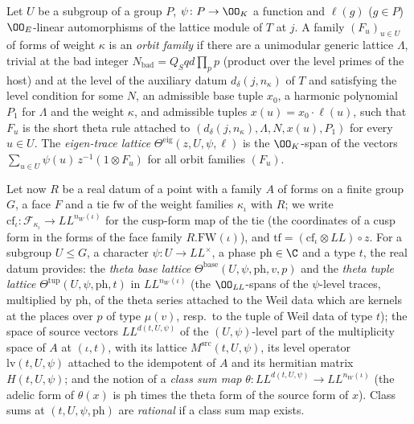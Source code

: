\begin{definition}\label{pf:onto3:thetaeig}
Let $U$ be a subgroup of a group $P$, $\psi\colon P\to\OO_K$ a function and $\ell(g)$ ($g\in P$) $\OO_E$-linear
automorphisms of the lattice module of $T$ at $j$. A family $(F_u)_{u\in U}$ of forms of weight $\kappa$ is an
\emph{orbit family} if there are a unimodular generic lattice $\Lambda$, trivial at the bad integer
$N_{\mathrm{bad}}=Q_Sqd\prod_pp$ (product over the level primes of the host) and at the level of the auxiliary datum
$d_\delta(j,n_\kappa)$ of $T$ and satisfying the level condition for some $N$, an admissible base tuple $x_0$, a
harmonic polynomial $P_1$ for $\Lambda$ and the weight $\kappa$, and admissible tuples $x(u)=x_0\cdot\ell(u)$, such
that $F_u$ is the short theta rule attached to $(d_\delta(j,n_\kappa),\Lambda,N,x(u),P_1)$ for every $u\in U$. The
\emph{eigen-trace lattice} $\Theta^{\mathrm{eig}}(z,U,\psi,\ell)$ is the $\OO_K$-span of the vectors
$\sum_{u\in U}\psi(u)\,z^{-1}(1\otimes F_u)$ for all orbit families $(F_u)$.
\end{definition}

Let now $R$ be a real datum of a point with a family $A$ of forms on a finite group $G$, a face $F$ and a tie
$\mathrm{fw}$ of the weight families $\kappa_\iota$ with $R$; we write $\mathrm{cf}_\iota\colon\mathcal F_{\kappa_\iota}
\to\mathit{LL}^{n_W(\iota)}$ for the cusp-form map of the tie (the coordinates of a cusp form in the forms of the face
family $R.\mathrm{FW}(\iota)$), and $\mathrm{tf}=(\mathrm{cf}_\iota\otimes\mathit{LL})\circ z$. For a subgroup
$U\le G$, a character $\psi\colon U\to\mathit{LL}^\times$, a phase $\mathrm{ph}\in\C$ and a type $t$, the real datum
provides: the \emph{theta base lattice} $\Theta^{\mathrm{base}}(U,\psi,\mathrm{ph},v,p)$ and the \emph{theta tuple
lattice} $\Theta^{\mathrm{tup}}(U,\psi,\mathrm{ph},t)$ in $\mathit{LL}^{n_W(\iota)}$ (the $\OO_{\mathit{LL}}$-spans of
the $\psi$-level traces, multiplied by $\mathrm{ph}$, of the theta series attached to the Weil data which are kernels
at the places over $p$ of type $\mu(v)$, resp.\ to the tuple of Weil data of type $t$); the space of source vectors
$\mathit{LL}^{d(t,U,\psi)}$ of the $(U,\psi)$-level part of the multiplicity space of $A$ at $(\iota,t)$, with its
lattice $M^{\mathrm{src}}(t,U,\psi)$, its level operator $\mathrm{lv}(t,U,\psi)$ attached to the idempotent of $A$ and its
hermitian matrix $H(t,U,\psi)$; and the notion of a \emph{class sum map} $\theta\colon\mathit{LL}^{d(t,U,\psi)}\to
\mathit{LL}^{n_W(\iota)}$ (the adelic form of $\theta(x)$ is $\mathrm{ph}$ times the theta form of the source form
of $x$). Class sums at $(t,U,\psi,\mathrm{ph})$ are \emph{rational} if a class sum map exists.

